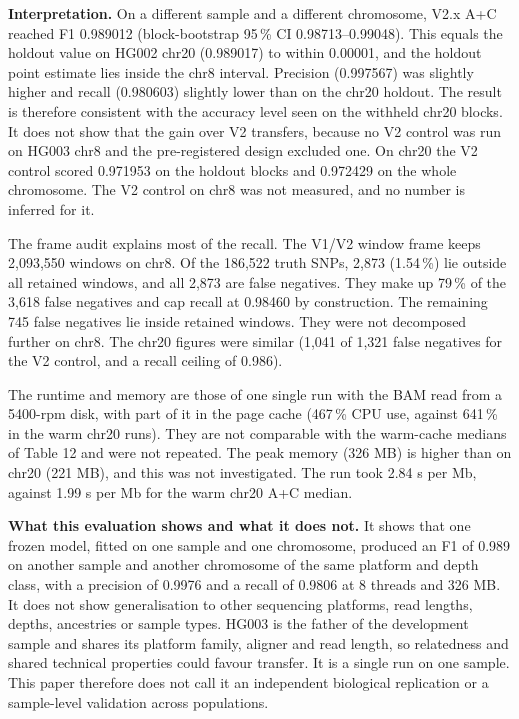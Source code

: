 \documentclass[11pt,a4paper]{article}
\begin{document}
\textbf{Interpretation.} On a different sample and a different chromosome, V2.x A+C reached F1 0.989012 (block-bootstrap 95\,\% CI 0.98713--0.99048). This equals the holdout value on HG002 chr20 (0.989017) to within 0.00001, and the holdout point estimate lies inside the chr8 interval. Precision (0.997567) was slightly higher and recall (0.980603) slightly lower than on the chr20 holdout. The result is therefore consistent with the accuracy level seen on the withheld chr20 blocks. It does not show that the gain over V2 transfers, because no V2 control was run on HG003 chr8 and the pre-registered design excluded one. On chr20 the V2 control scored 0.971953 on the holdout blocks and 0.972429 on the whole chromosome. The V2 control on chr8 was not measured, and no number is inferred for it.

The frame audit explains most of the recall. The V1/V2 window frame keeps 2,093,550 windows on chr8. Of the 186,522 truth SNPs, 2,873 (1.54\,\%) lie outside all retained windows, and all 2,873 are false negatives. They make up 79\,\% of the 3,618 false negatives and cap recall at 0.98460 by construction. The remaining 745 false negatives lie inside retained windows. They were not decomposed further on chr8. The chr20 figures were similar (1,041 of 1,321 false negatives for the V2 control, and a recall ceiling of 0.986).

The runtime and memory are those of one single run with the BAM read from a 5400-rpm disk, with part of it in the page cache (467\,\% CPU use, against 641\,\% in the warm chr20 runs). They are not comparable with the warm-cache medians of Table 12 and were not repeated. The peak memory (326 MB) is higher than on chr20 (221 MB), and this was not investigated. The run took 2.84 s per Mb, against 1.99 s per Mb for the warm chr20 A+C median.

\textbf{What this evaluation shows and what it does not.} It shows that one frozen model, fitted on one sample and one chromosome, produced an F1 of 0.989 on another sample and another chromosome of the same platform and depth class, with a precision of 0.9976 and a recall of 0.9806 at 8 threads and 326 MB. It does not show generalisation to other sequencing platforms, read lengths, depths, ancestries or sample types. HG003 is the father of the development sample and shares its platform family, aligner and read length, so relatedness and shared technical properties could favour transfer. It is a single run on one sample. This paper therefore does not call it an independent biological replication or a sample-level validation across populations.
\end{document}

